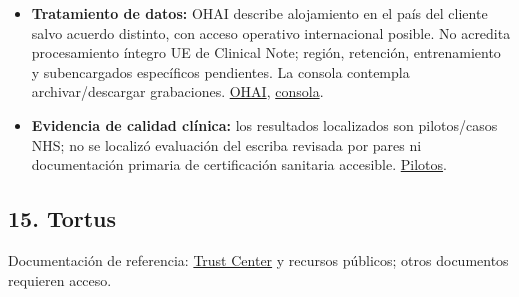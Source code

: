 \begin{itemize}
\item \textbf{Tratamiento de datos:} OHAI describe alojamiento en el país del cliente salvo acuerdo distinto, con acceso operativo internacional posible. No acredita procesamiento íntegro UE de Clinical Note; región, retención, entrenamiento y subencargados específicos pendientes. La consola contempla archivar/\allowbreak{}descargar grabaciones. \href{https://www.oracle.com/uk/corporate/acquisitions/cerner/security/}{OHAI}, \href{https://docs.oracle.com/en/corporate/accessibility/templates/t2-16689.html}{consola}.
\item \textbf{Evidencia de calidad clínica:} los resultados localizados son pilotos/\allowbreak{}casos NHS; no se localizó evaluación del escriba revisada por pares ni documentación primaria de certificación sanitaria accesible. \href{https://www.oracle.com/uk/news/announcement/oracle-health-clinicalai-agent-helps-uk-doctors-spend-more-time-on-patient-care-2026-02-12/}{Pilotos}.
\end{itemize}

\subsection*{15. Tortus}
\label{provider:15}

Documentación de referencia: \href{https://trust.tortus.ai/}{Trust Center} y recursos públicos; otros documentos requieren acceso.

